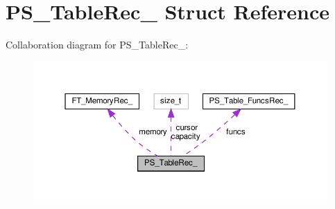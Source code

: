 \hypertarget{structPS__TableRec__}{}\section{P\+S\+\_\+\+Table\+Rec\+\_\+ Struct Reference}
\label{structPS__TableRec__}


Collaboration diagram for P\+S\+\_\+\+Table\+Rec\+\_\+\+:
\nopagebreak
\begin{figure}[H]
\begin{center}
\leavevmode
\includegraphics[width=350pt]{structPS__TableRec____coll__graph}
\end{center}
\end{figure}
